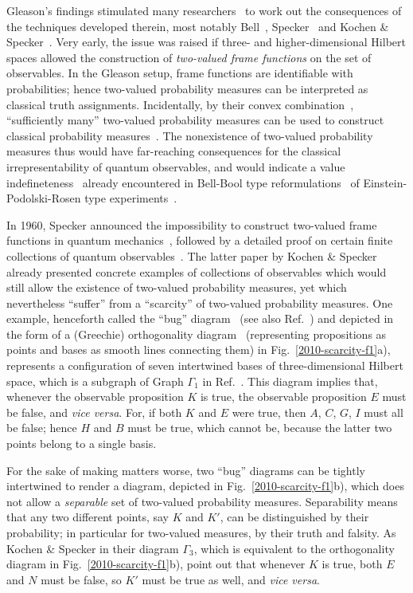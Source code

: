 \documentclass[pra,amsfonts,showpacs,showkeys,preprint]{revtex4}%
\begin{document}
Gleason's findings stimulated many researchers~\cite{ZirlSchl-65,Alda,Alda2,kamber64,kamber65} to work out the consequences of the techniques developed therein,
most notably Bell~\cite{bell-87,mermin-93}, Specker~\cite{specker-60} and Kochen \& Specker~\cite{kochen1,svozil-tkadlec}.
Very early, the issue was raised if three- and higher-dimensional Hilbert spaces allowed the construction of
{\em two-valued frame functions} on the set of observables.
In the Gleason setup, frame functions are identifiable with probabilities; hence
two-valued probability measures can be interpreted as classical truth assignments.
Incidentally, by their convex combination~\cite{ziegler}, ``sufficiently many'' two-valued probability measures can be used to construct classical probability measures~\cite{pitowsky}.
The nonexistence of two-valued probability measures thus would have far-reaching consequences for the classical irrepresentability of quantum observables,
and would indicate a value indefineteness~\cite{peres222} already encountered in Bell-Bool type reformulations~\cite{pitowsky-89a} of  Einstein-Podolski-Rosen type experiments~\cite{epr}.


In 1960, Specker announced the impossibility to construct two-valued frame functions in quantum mechanics~\cite{specker-60},
followed by a detailed proof on certain finite collections of quantum observables~\cite{kochen1}.
The latter paper by Kochen \& Specker already presented concrete examples of collections of observables which would still allow the existence of two-valued probability measures,
yet which nevertheless ``suffer'' from a ``scarcity'' of two-valued probability measures.
One example, henceforth called the  ``bug'' diagram~\cite{Specker-priv} (see also Ref.~\cite[Fig.~2.4.6]{pulmannova-91})
and depicted in the form of a (Greechie) orthogonality diagram~\cite{greechie:71,pulmannova-91} (representing propositions as points
and bases as smooth lines connecting them) in Fig.~\ref{2010-scarcity-f1}a),
represents a configuration of seven intertwined bases of three-dimensional Hilbert space, which is a subgraph of Graph $\Gamma_1$ in Ref.~\cite{kochen1}.
This diagram implies that, whenever the observable proposition $K$ is true, the observable proposition $E$ must be false, and {\em vice versa}.
For, if both $K$ and $E$ were true, then
$A$,
$C$,
$G$,
$I$ must all be false; hence $H$ and
$B$ must be true, which cannot be, because the latter two points belong to a single basis.

For the sake of making matters worse, two ``bug'' diagrams can be tightly intertwined to render a diagram,
depicted in Fig.~\ref{2010-scarcity-f1}b), which does not allow a {\em separable} set of two-valued probability measures.
Separability means that any two different points, say  $K$ and $K'$, can be distinguished by their probability;
in particular for two-valued measures, by their truth and falsity.
As Kochen \& Specker in their diagram $\Gamma_3$, which is equivalent to the orthogonality diagram in Fig.~\ref{2010-scarcity-f1}b), point out  that
whenever $K$ is true, both $E$ and $N$ must be false, so $K'$ must be true as well, and {\em vice versa}.
\end{document}
